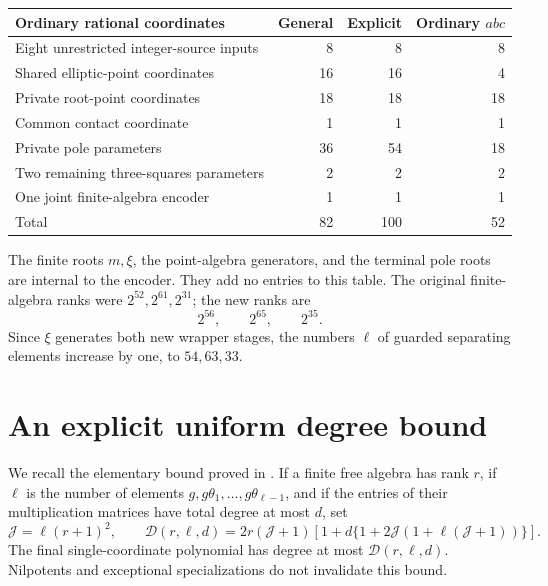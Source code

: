 \documentclass[11pt]{article}
\begin{document}
\begin{center}
\begin{tabular}{lrrr}
\toprule
Ordinary rational coordinates & General & Explicit & Ordinary \(abc\)\\
\midrule
Eight unrestricted integer-source inputs &8&8&8\\
Shared elliptic-point coordinates &16&16&4\\
Private root-point coordinates &18&18&18\\
Common contact coordinate &1&1&1\\
Private pole parameters &36&54&18\\
Two remaining three-squares parameters &2&2&2\\
One joint finite-algebra encoder &1&1&1\\
\midrule
Total &82&100&52\\
\bottomrule
\end{tabular}
\end{center}

The finite roots \(m,\xi\), the point-algebra generators, and the
terminal pole roots are internal to the encoder.  They add no entries
to this table.  The original finite-algebra ranks were
\(2^{52},2^{61},2^{31}\); the new ranks are
\[
                              2^{56},\qquad2^{65},\qquad2^{35}.
\]
Since \(\xi\) generates both new wrapper stages, the numbers \(\ell\)
of guarded separating elements increase by one, to \(54,63,33\).

\section{An explicit uniform degree bound}

We recall the elementary bound proved in \cite{Encoder}.  If a finite
free algebra has rank \(r\), if \(\ell\) is the number of elements
\(g,g\theta_1,\ldots,g\theta_{\ell-1}\), and if the entries of their
multiplication matrices have total degree at most \(d\), set
\[
 \mathcal J=\ell(r+1)^2,\qquad
 \mathcal D(r,\ell,d)=
 2r(\mathcal J+1)
 \left[1+d\{1+2\mathcal J(1+\ell(\mathcal J+1))\}\right].
\]
The final single-coordinate polynomial has degree at most
\(\mathcal D(r,\ell,d)\).  Nilpotents and exceptional specializations
do not invalidate this bound.
\end{document}
